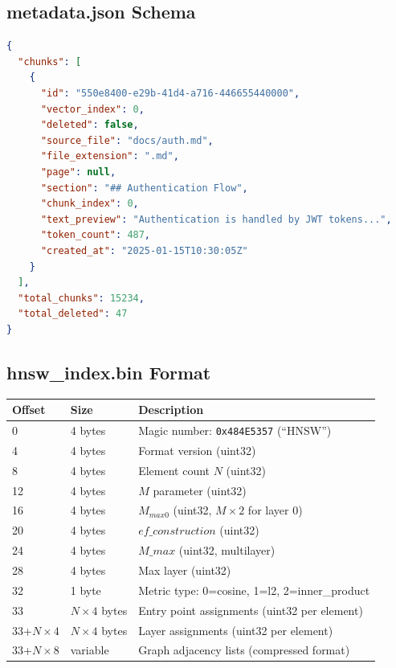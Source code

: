 \documentclass[11pt,a4paper]{article}
\begin{document}
\subsection{metadata.json Schema}

\begin{lstlisting}[language=JSON]
{
  "chunks": [
    {
      "id": "550e8400-e29b-41d4-a716-446655440000",
      "vector_index": 0,
      "deleted": false,
      "source_file": "docs/auth.md",
      "file_extension": ".md",
      "page": null,
      "section": "## Authentication Flow",
      "chunk_index": 0,
      "text_preview": "Authentication is handled by JWT tokens...",
      "token_count": 487,
      "created_at": "2025-01-15T10:30:05Z"
    }
  ],
  "total_chunks": 15234,
  "total_deleted": 47
}
\end{lstlisting}

\subsection{hnsw\_index.bin Format}

\begin{center}
\begin{tabular}{@{}p{3.5cm}p{2cm}p{8cm}@{}}
\toprule
\textbf{Offset} & \textbf{Size} & \textbf{Description} \\
\midrule
0 & 4 bytes & Magic number: \texttt{0x484E5357} (``HNSW'') \\
4 & 4 bytes & Format version (uint32) \\
8 & 4 bytes & Element count $N$ (uint32) \\
12 & 4 bytes & $M$ parameter (uint32) \\
16 & 4 bytes & $M_{max0}$ (uint32, $M \times 2$ for layer 0) \\
20 & 4 bytes & $ef\_construction$ (uint32) \\
24 & 4 bytes & $M\_max$ (uint32, multilayer) \\
28 & 4 bytes & Max layer (uint32) \\
32 & 1 byte & Metric type: 0=cosine, 1=l2, 2=inner\_product \\
33 & $N \times 4$ bytes & Entry point assignments (uint32 per element) \\
33+$N \times 4$ & $N \times 4$ bytes & Layer assignments (uint32 per element) \\
33+$N \times 8$ & variable & Graph adjacency lists (compressed format) \\
\bottomrule
\end{tabular}
\end{center}
\end{document}
